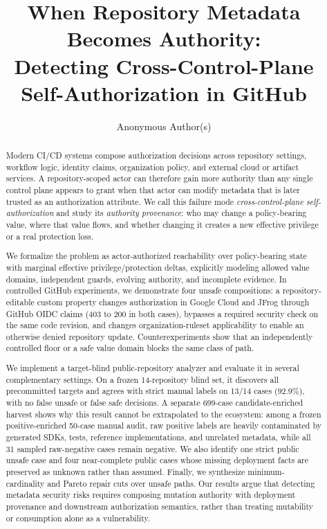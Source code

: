 \documentclass[sigconf,review,anonymous]{acmart}
\title{When Repository Metadata Becomes Authority:\\Detecting Cross-Control-Plane Self-Authorization in GitHub}
\author{Anonymous Author(s)}
\affiliation{\institution{Anonymous}}
\begin{document}
\begin{abstract}
Modern CI/CD systems compose authorization decisions across repository settings,
workflow logic, identity claims, organization policy, and external cloud or
artifact services.  A repository-scoped actor can therefore gain more authority
than any single control plane appears to grant when that actor can modify
metadata that is later trusted as an authorization attribute.  We call this
failure mode \emph{cross-control-plane self-authorization} and study its
\emph{authority provenance}: who may change a policy-bearing value, where that
value flows, and whether changing it creates a new effective privilege or a real
protection loss.

We formalize the problem as actor-authorized reachability over policy-bearing
state with marginal effective privilege/protection deltas, explicitly modeling
allowed value domains, independent guards, evolving authority, and incomplete
evidence.  In controlled GitHub experiments, we demonstrate four unsafe
compositions: a repository-editable custom property changes authorization in
Google Cloud and JFrog through GitHub OIDC claims (403 to 200 in both cases),
bypasses a required security check on the same code revision, and changes
organization-ruleset applicability to enable an otherwise denied repository
update.  Counterexperiments show that an independently controlled floor or a
safe value domain blocks the same class of path.

We implement a target-blind public-repository analyzer and evaluate it in several
complementary settings.  On a frozen 14-repository blind set, it discovers all
precommitted targets and agrees with strict manual labels on 13/14 cases
(92.9\%), with no false unsafe or false safe decisions.  A separate 699-case
candidate-enriched harvest shows why this result cannot be extrapolated to the
ecosystem: among a frozen positive-enriched 50-case manual audit, raw positive
labels are heavily contaminated by generated SDKs, tests, reference
implementations, and unrelated metadata, while all 31 sampled raw-negative cases
remain negative.  We also identify one strict public unsafe case and four
near-complete public cases whose missing deployment facts are preserved as
unknown rather than assumed.  Finally, we synthesize minimum-cardinality and
Pareto repair cuts over unsafe paths.  Our results argue that detecting metadata
security risks requires composing mutation authority with deployment provenance
and downstream authorization semantics, rather than treating mutability or
consumption alone as a vulnerability.
\end{abstract}
\end{document}
